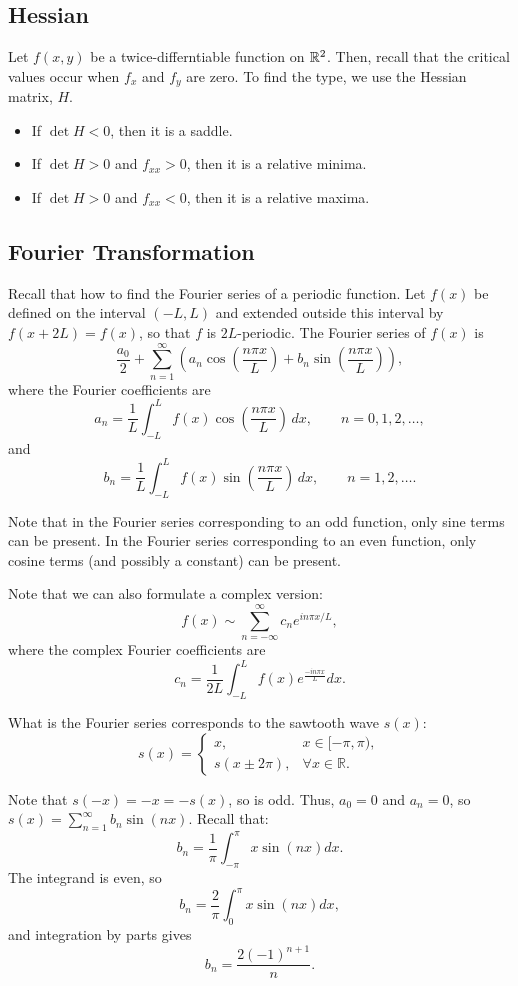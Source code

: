 \subsection{Hessian}

Let $f(x,y)$ be a twice-differntiable function on $\mathbb{R}^2$. Then, recall that 
the critical values occur when $f_x$ and $f_y$ are zero. To find the type, 
we use the Hessian matrix, $H$. 
\begin{itemize}
\item If $\det H < 0$, then it is a saddle.
\item If $\det H > 0$ and $f_{xx} > 0$, then it is a relative minima.
\item If $\det H > 0$ and $f_{xx} < 0$, then it is a relative maxima.
\end{itemize}

\subsection{Fourier Transformation}

Recall that how to find the Fourier series of a periodic function.
Let $f(x)$ be defined on the interval $(-L,L)$ and extended outside this
interval by $f(x+2L)=f(x)$, so that $f$ is $2L$-periodic. 
The Fourier series of $f(x)$ is
\[
\frac{a_0}{2}
+
\sum_{n=1}^{\infty}
\left(
a_n\cos\left(\frac{n\pi x}{L}\right)
+
b_n\sin\left(\frac{n\pi x}{L}\right)
\right),
\]
where the Fourier coefficients are
\[
a_n
=
\frac{1}{L}
\int_{-L}^{L}
f(x)\cos\left(\frac{n\pi x}{L}\right)\,dx,
\qquad n=0,1,2,\ldots,
\]
and
\[
b_n
=
\frac{1}{L}
\int_{-L}^{L}
f(x)\sin\left(\frac{n\pi x}{L}\right)\,dx,
\qquad n=1,2,\ldots.
\]
\begin{remark}
Note that in the Fourier series corresponding to an odd function, 
only sine terms can be present. In the Fourier series
corresponding to an even function, only cosine terms (and possibly a constant)
can be present.
\end{remark}
Note that we can also formulate a complex version:
\[
f(x)
\sim
\sum_{n=-\infty}^{\infty}
c_n e^{in\pi x/L},
\]
where the complex Fourier coefficients are
\[
c_n
=
\frac{1}{2L}
\int_{-L}^{L}
f(x)e^{\frac{-in\pi x}{L}}dx.
\]
\begin{exercise}
What is the Fourier series corresponds to the sawtooth wave $s(x)$:
\[
s(x)=
\begin{cases}
x, & x\in[-\pi,\pi),\\
s(x\pm2\pi), & \forall x\in\mathbb{R}.
\end{cases}
\]
\end{exercise}
\begin{solution}
Note that $s(-x) = -x = -s(x)$, so is odd. Thus, $a_0 = 0$ and $a_n = 0$,
so $s(x) = \sum_{n=1}^{\infty} b_n\sin(nx)$. Recall that:
\[
b_n = \frac{1}{\pi} \int_{-\pi}^{\pi} x\sin(nx)dx.
\]
The integrand is even, so 
\[
b_n = \frac{2}{\pi}\int_{0}^{\pi} x\sin(nx)dx,
\]
and integration by parts gives
\[
b_n = \frac{2(-1)^{n + 1}}{n}.
\]
\end{solution}

